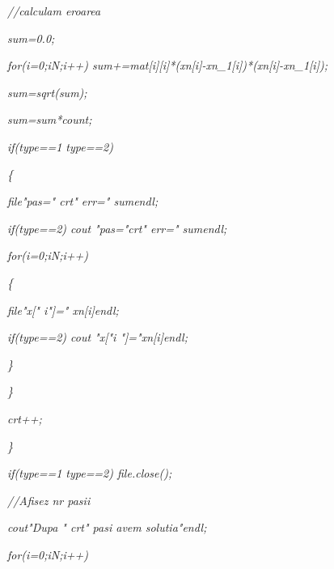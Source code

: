 \documentclass[a4paper,twoside]{book}
\begin{document}
\textit{\qquad \qquad //calculam eroarea}

\textit{\qquad \qquad sum=0.0;}

\textit{\qquad \qquad for(i=0;i\TEXTsymbol{<}N;i++)
sum+=mat[i][i]*(xn[i]-xn\_1[i])*(xn[i]-xn\_1[i]);}

\textit{\qquad \qquad sum=sqrt(sum);}

\textit{\qquad \qquad sum=sum*count;}

\textit{\qquad \qquad if(type==1 \TEXTsymbol{\vert}\TEXTsymbol{\vert}
type==2)}

\textit{\qquad \qquad \{}

\textit{\qquad \qquad \qquad file\TEXTsymbol{<}\TEXTsymbol{<}"pas="%
\TEXTsymbol{<}\TEXTsymbol{<}crt\TEXTsymbol{<}\TEXTsymbol{<}" err="%
\TEXTsymbol{<}\TEXTsymbol{<}sum\TEXTsymbol{<}\TEXTsymbol{<}endl;}

\textit{\qquad \qquad \qquad if(type==2) cout\TEXTsymbol{<}\TEXTsymbol{<}%
"pas="\TEXTsymbol{<}\TEXTsymbol{<}crt\TEXTsymbol{<}\TEXTsymbol{<}" err="%
\TEXTsymbol{<}\TEXTsymbol{<}sum\TEXTsymbol{<}\TEXTsymbol{<}endl;}

\textit{\qquad \qquad \qquad for(i=0;i\TEXTsymbol{<}N;i++)}

\textit{\qquad \qquad \qquad \{}

\textit{\qquad \qquad \qquad \qquad file\TEXTsymbol{<}\TEXTsymbol{<}"x["%
\TEXTsymbol{<}\TEXTsymbol{<}i\TEXTsymbol{<}\TEXTsymbol{<}"]="\TEXTsymbol{<}%
\TEXTsymbol{<}xn[i]\TEXTsymbol{<}\TEXTsymbol{<}endl;}

\textit{\qquad \qquad \qquad \qquad if(type==2) cout\TEXTsymbol{<}%
\TEXTsymbol{<}"x["\TEXTsymbol{<}\TEXTsymbol{<}i\TEXTsymbol{<}\TEXTsymbol{<}%
"]="\TEXTsymbol{<}\TEXTsymbol{<}xn[i]\TEXTsymbol{<}\TEXTsymbol{<}endl;}

\textit{\qquad \qquad \qquad \}}

\textit{\qquad \qquad \}}

\textit{\qquad \qquad crt++;}

\textit{\qquad \}}

\textit{\qquad if(type==1 \TEXTsymbol{\vert}\TEXTsymbol{\vert} type==2)
file.close();}

\textit{\qquad //Afisez nr pasii}

\textit{\qquad cout\TEXTsymbol{<}\TEXTsymbol{<}"Dupa "\TEXTsymbol{<}%
\TEXTsymbol{<}crt\TEXTsymbol{<}\TEXTsymbol{<}" pasi avem solutia"\TEXTsymbol{%
<}\TEXTsymbol{<}endl;}

\qquad \textit{for(i=0;i\TEXTsymbol{<}N;i++)}
\end{document}
